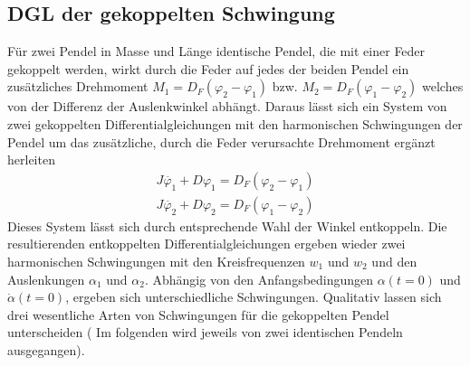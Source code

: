 \subsection{DGL der gekoppelten Schwingung}
Für zwei Pendel in Masse und Länge identische Pendel, die mit einer Feder gekoppelt werden, wirkt durch die Feder auf jedes der beiden Pendel ein zusätzliches Drehmoment $M_1=D_F(\varphi_2-\varphi_1)$ bzw. $M_2=D_F(\varphi_1-\varphi_2)$
welches von der Differenz der Auslenkwinkel abhängt. Daraus lässt sich ein System von zwei gekoppelten Differentialgleichungen mit den harmonischen Schwingungen der Pendel um das zusätzliche, durch die Feder verursachte Drehmoment ergänzt herleiten
\begin{gather}
J\ddot{\varphi_1}+D\varphi_1=D_F(\varphi_2-\varphi_1) \\
J\ddot{\varphi_2}+D\varphi_2=D_F(\varphi_1-\varphi_2)
\end{gather} 
Dieses System lässt sich durch entsprechende Wahl der Winkel entkoppeln. Die resultierenden entkoppelten 
Differentialgleichungen ergeben wieder zwei harmonischen Schwingungen mit den Kreisfrequenzen $w_1$ und 
$w_2$ und den Auslenkungen $\alpha_1$ und $\alpha_2$. \newline
Abhängig von den Anfangsbedingungen $\alpha(t=0)$ und $\dot{\alpha}(t=0)$, ergeben sich unterschiedliche 
Schwingungen. Qualitativ lassen sich drei wesentliche Arten von Schwingungen für die gekoppelten Pendel 
unterscheiden ( Im folgenden wird jeweils von zwei identischen Pendeln ausgegangen).

